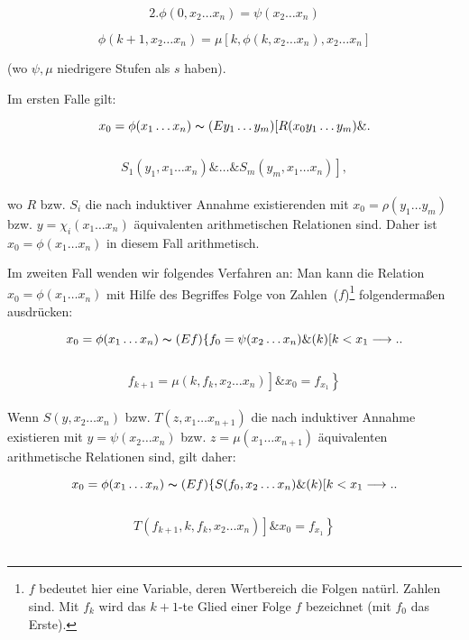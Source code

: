 \documentclass[draft]{scrartcl}
\begin{document}
$$
2. \phi\left(0, x_2 \dots x_n\right) = \psi\left(x_2 \dots x_n\right)
$$

$$
\phi\left(k + 1, x_2 \dots x_n\right) = \mu\left[k, \phi\left(k, x_2 \dots x_n\right), x_2 \dots x_n\right]
$$

(wo $\psi, \mu$ niedrigere Stufen als $s$ haben).

Im ersten Falle gilt:

$$
x_0 = \phi\left(x_1 \dots x_n\right) \thicksim \left(Ey_1 \dots y_m\right) \left[R\left(x_0 y_1 \dots y_m\right) \& \right.
$$\\[\spacebetweenbreakedequations]
$$\left.S_1\left(y_1, x_1 \dots x_n\right) \& \dots \& S_m\left(y_m, x_1 \dots x_n\right)\right],
$$\\[\spaceafterbreakedequation]

wo $R$ bzw. $S_i$ die nach induktiver Annahme existierenden mit $x_0 = \rho\left(y_1 \dots y_m\right)$ bzw.
$y = \chi_i\left(x_1 \dots x_n\right)$ äquivalenten arithmetischen
Relationen sind. Daher ist $x_0 = \phi\left(x_1\dots x_n\right)$ in
diesem Fall arithmetisch.

Im zweiten Fall wenden wir folgendes Verfahren an: Man
kann die Relation $x_0 = \phi\left(x_1 \dots x_n\right)$ mit Hilfe des Begriffes \glqq Folge von Zahlen\grqq\
($f$)\footnote{$f$ bedeutet hier eine Variable, deren Wertbereich die Folgen natürl. Zahlen sind. Mit $f_k$ wird das $k + 1$-te Glied einer Folge $f$ bezeichnet (mit $f_0$ das Erste).}
folgendermaßen ausdrücken:

$$
x_0 = \phi\left(x_1 \dots x_n\right) \thicksim \left(Ef\right)\left\{ f_0 = \psi\left(x_2 \dots x_n\right) \& \left(k\right) \left[k < x_1 \longrightarrow\right.\right.
$$\\[\spacebetweenbreakedequations]
$$\left.\left. f_{k + 1} = \mu\left(k, f_k, x_2 \dots x_n\right)\right] \& x_0 = f_{x_1}\right\}
$$\\[\spaceafterbreakedequation]

Wenn $S\left(y, x_2 \dots x_n\right)$ bzw. $T\left(z, x_1 \dots x_{n + 1}\right)$ die
nach induktiver Annahme existieren mit $y = \psi\left(x_2 \dots x_n\right)$ bzw.
$z = \mu\left(x_1 \dots x_{n + 1}\right)$ äquivalenten arithmetische Relationen sind, gilt daher:

\begin{equation}
x_0 = \phi\left(x_1 \dots x_n\right) \thicksim \left(Ef\right) \left\{S\left(f_0, x_2 \dots x_n\right) \& \left(k\right)\left[k < x_1 \longrightarrow \right.\right.
\end{equation}\\[\spacebetweenbreakedequations]
\begin{equation*}
\left.\left.T\left(f_{k + 1}, k, f_k, x_2 \dots x_n\right)\right] \& x_0 = f_{x_1}\right\}
\end{equation*}\\[\spaceafterbreakedequation]
\end{document}
